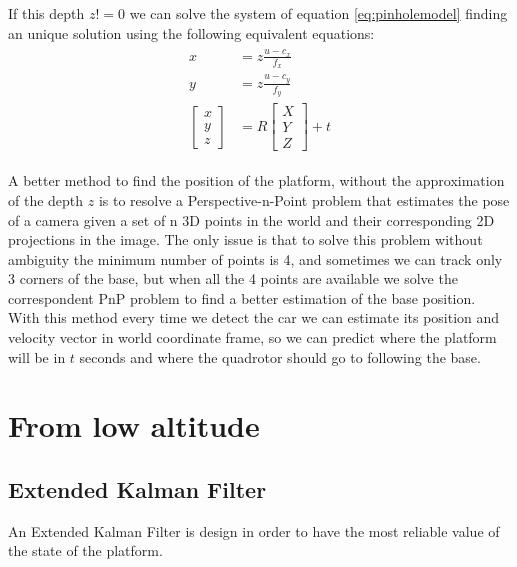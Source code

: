 If this depth $z!=0$ we can  solve the system of equation \ref{eq:pinholemodel} finding an unique solution using the following equivalent equations:
\begin{align}
\begin{split}
x &= z\frac{u-c_x}{f_x}\\[10pt]
y &= z\frac{u-c_y}{f_y}\\[10pt]
{\begin{bmatrix}
x \\[10pt]
y \\[10pt]
z
\end{bmatrix}} &= 
R {\begin{bmatrix}
X \\[10pt]
Y \\[10pt]
Z
\end{bmatrix}} + t
\end{split}
\end{align}

A better method to find the position of the platform, without the approximation of the depth $z$ is to resolve a Perspective-n-Point problem %
that estimates the pose of a camera given a set of n 3D points in the world and their corresponding 2D projections in the image. The only issue is that to solve this problem without ambiguity the minimum number of points is 4, and sometimes we can track only 3 corners of the base, but when all the 4 points are available we solve the correspondent PnP problem to find a better estimation of the base position.\\

With this method every time we detect the car we can estimate its position and velocity vector in world coordinate frame, so  we can predict where the platform will be in $t$ seconds and where the quadrotor should go to following the base.\\

\section{From low altitude}

\subsection{Extended Kalman Filter}
An Extended Kalman Filter is design in order to have the most reliable value of the state of the platform.

